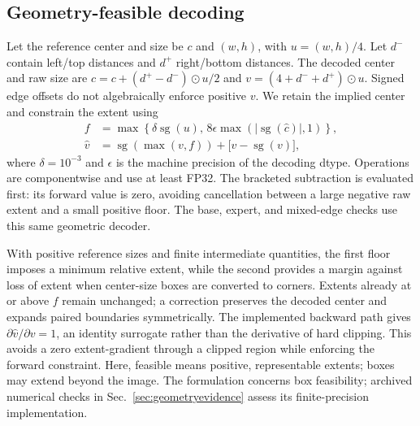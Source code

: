 \subsection{Geometry-feasible decoding}
\label{sec:lrs}
Let the reference center and size be $c$ and $(w,h)$, with $u=(w,h)/4$. Let $d^{-}$ contain left/top distances and $d^{+}$ right/bottom distances. The decoded center and raw size are $\hat c=c+(d^{+}-d^{-})\odot u/2$ and $v=(4+d^{-}+d^{+})\odot u$. Signed edge offsets do not algebraically enforce positive $v$. We retain the implied center and constrain the extent using
\begin{equation}
\begin{aligned}
f&=\max\!\left\{\delta\operatorname{sg}(u),\,
8\epsilon\max(|\operatorname{sg}(\hat c)|,1)\right\},\\
\hat v&=\operatorname{sg}(\max(v,f))+\bigl[v-\operatorname{sg}(v)\bigr],
\end{aligned}
\label{eq:geometry}
\end{equation}
where $\delta=10^{-3}$ and $\epsilon$ is the machine precision of the decoding dtype. Operations are componentwise and use at least FP32. The bracketed subtraction is evaluated first: its forward value is zero, avoiding cancellation between a large negative raw extent and a small positive floor. The base, expert, and mixed-edge checks use this same geometric decoder.

With positive reference sizes and finite intermediate quantities, the first floor imposes a minimum relative extent, while the second provides a margin against loss of extent when center-size boxes are converted to corners. Extents already at or above $f$ remain unchanged; a correction preserves the decoded center and expands paired boundaries symmetrically. The implemented backward path gives $\partial\hat v/\partial v=1$, an identity surrogate rather than the derivative of hard clipping. This avoids a zero extent-gradient through a clipped region while enforcing the forward constraint. Here, feasible means positive, representable extents; boxes may extend beyond the image. The formulation concerns box feasibility; archived numerical checks in Sec.~\ref{sec:geometryevidence} assess its finite-precision implementation.

